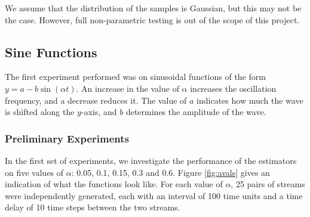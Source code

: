 \documentclass[a4paper,11pt]{article}
\begin{document}
We assume that the distribution of the samples is Gaussian, but this may not be
the case. However, full non-parametric testing is out of the scope of this project.
\subsection{Sine Functions}
\label{sec-8-1}

The first experiment performed was on sinusoidal functions of the form
$y=a-b\sin(\alpha t)$. An increase in the value of $\alpha$ increases the
oscillation frequency, and a decrease reduces it. The value of $a$ indicates how
much the wave is shifted along the $y$-axis, and $b$ determines the
amplitude of the wave.
\subsubsection{Preliminary Experiments}
\label{sec-8-1-1}

In the first set of experiments, we investigate the performance of the
estimators on five values of $\alpha$: 0.05, 0.1, 0.15, 0.3 and 0.6. Figure
\ref{fig:avals} gives an indication of what the functions look like. For
each value of $\alpha$, 25 pairs of streams were independently generated, each
with an interval of 100 time units and a time delay of 10 time steps between the
two streams. 
\end{document}
